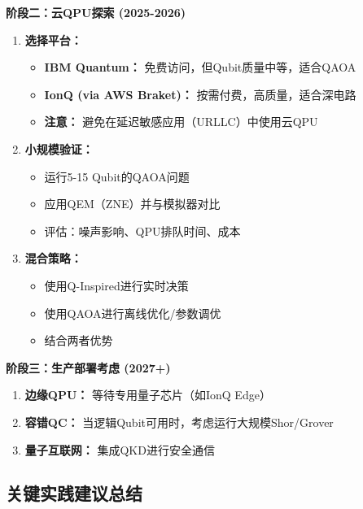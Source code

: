 \documentclass[11pt,a4paper]{article}
\begin{document}
\textbf{阶段二：云QPU探索 (2025-2026)}

\begin{enumerate}
\item \textbf{选择平台：}
\begin{itemize}
\item \textbf{IBM Quantum：} 免费访问，但Qubit质量中等，适合QAOA
\item \textbf{IonQ (via AWS Braket)：} 按需付费，高质量，适合深电路
\item \textbf{注意：} 避免在延迟敏感应用（URLLC）中使用云QPU
\end{itemize}

\item \textbf{小规模验证：}
\begin{itemize}
\item 运行5-15 Qubit的QAOA问题
\item 应用QEM（ZNE）并与模拟器对比
\item 评估：噪声影响、QPU排队时间、成本
\end{itemize}

\item \textbf{混合策略：}
\begin{itemize}
\item 使用Q-Inspired进行实时决策
\item 使用QAOA进行离线优化/参数调优
\item 结合两者优势
\end{itemize}
\end{enumerate}

\textbf{阶段三：生产部署考虑 (2027+)}

\begin{enumerate}
\item \textbf{边缘QPU：} 等待专用量子芯片（如IonQ Edge）
\item \textbf{容错QC：} 当逻辑Qubit可用时，考虑运行大规模Shor/Grover
\item \textbf{量子互联网：} 集成QKD进行安全通信
\end{enumerate}

\subsection{关键实践建议总结}
\end{document}
